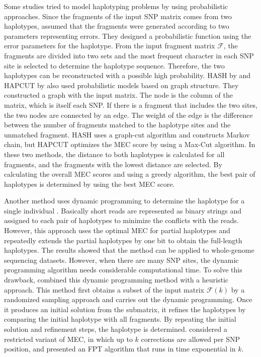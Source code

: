 Some studies tried to model haplotyping problems by using probabilistic approaches. 
Since the fragments of the input SNP matrix comes from two haplotypes, 
\cite{chen2008linear} assumed that the fragments were generated according to two parameters representing errors. 
They designed a probabilistic function using the error parameters for the haplotype. 
From the input fragment matrix $\mathcal{F}$, the fragments are divided into two sets and the most frequent character 
in each SNP site is selected to determine the haplotype sequence. 
Therefore, the two haplotypes can be reconstructed with a possible high probability. 
HASH by \cite{bansal2008mcmc} and HAPCUT by \cite{Bansal2008} also used probabilistic models based on graph structure. 
They constructed a graph with the input matrix. The node is the column of the matrix, which is itself each SNP. 
If there is a fragment that includes the two sites, the two nodes are connected by an edge. 
The weight of the edge is the difference between the number of fragments matched to the haplotype sites and the unmatched fragment. 
HASH uses a graph-cut algorithm and constructs Markov chain, 
but HAPCUT optimizes the MEC score by using a Max-Cut algorithm. 
In these two methods, the distance to both haplotypes is calculated for all fragments, and the fragments with the lowest distance are selected. 
By calculating the overall MEC scores and using a greedy algorithm, the best pair of haplotypes is determined by using the best MEC score.

Another method uses dynamic programming to determine the haplotype for a single individual \citep{he2010optimal}. 
Basically short reads are represented as binary strings and assigned to each pair of haplotypes to minimize the conflicts with the reads. 
However, this approach uses the optimal MEC for partial haplotypes and repeatedly extends the partial haplotypes by one bit to obtain the full-length haplotypes. 
The results showed that the method can be applied to whole-genome sequencing datasets. However, when there are many SNP sites, 
the dynamic programming algorithm needs considerable computational time. To solve this drawback, 
\cite{deng2013highly} combined this dynamic programming method with a heuristic approach. 
This method first obtains a subset of the input matrix $\mathcal{F}(k)$ by a randomized sampling approach and carries out the dynamic programming. 
Once it produces an initial solution from the submatrix, it refines the haplotypes by comparing the initial haplotype with all fragments. 
By repeating the initial solution and refinement steps, the haplotype is determined.
\cite{Pirola2015} considered a restricted variant of MEC, in which up to $k$ corrections are allowed per SNP position, 
and presented an FPT algorithm that runs in time exponential in $k$.

